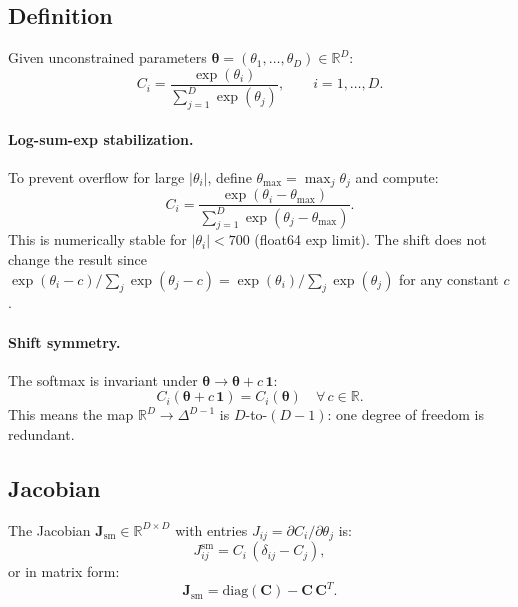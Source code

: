 \documentclass[11pt]{article}
\newcommand{\CC}{\mathbf{C}}
\newcommand{\ttheta}{\boldsymbol{\theta}}
\newcommand{\JJ}{\mathbf{J}}
\newcommand{\ones}{\mathbf{1}}
\begin{document}
\subsection{Definition}

Given unconstrained parameters $\ttheta = (\theta_1, \ldots, \theta_D) \in \mathbb{R}^D$:
%
\begin{equation}
  \label{eq:softmax}
  C_i = \frac{\exp(\theta_i)}{\sum_{j=1}^D \exp(\theta_j)},
  \qquad i = 1, \ldots, D.
\end{equation}
%

\paragraph{Log-sum-exp stabilization.}
To prevent overflow for large $|\theta_i|$, define
$\theta_{\max} = \max_j \theta_j$ and compute:
%
\begin{equation}
  \label{eq:logsumexp}
  C_i = \frac{\exp(\theta_i - \theta_{\max})}
             {\sum_{j=1}^D \exp(\theta_j - \theta_{\max})}.
\end{equation}
%
This is numerically stable for $|\theta_i| < 700$ (float64 exp limit).
The shift does not change the result since
$\exp(\theta_i - c)/\sum_j \exp(\theta_j - c) = \exp(\theta_i)/\sum_j \exp(\theta_j)$
for any constant $c$.

\paragraph{Shift symmetry.}
The softmax is invariant under $\ttheta \to \ttheta + c\,\ones$:
%
\begin{equation}
  C_i(\ttheta + c\,\ones) = C_i(\ttheta) \quad \forall\,c \in \mathbb{R}.
\end{equation}
%
This means the map $\mathbb{R}^D \to \Delta^{D-1}$ is $D$-to-$(D{-}1)$:
one degree of freedom is redundant.

\subsection{Jacobian}

The Jacobian $\JJ_\mathrm{sm} \in \mathbb{R}^{D \times D}$ with entries
$J_{ij} = \partial C_i / \partial \theta_j$ is:
%
\begin{equation}
  \label{eq:softmax-jacobian}
  \boxed{
    J_{ij}^\mathrm{sm} = C_i\,(\delta_{ij} - C_j),
  }
\end{equation}
%
or in matrix form:
%
\begin{equation}
  \label{eq:softmax-jacobian-matrix}
  \JJ_\mathrm{sm} = \mathrm{diag}(\CC) - \CC\,\CC^T.
\end{equation}
%
\end{document}
